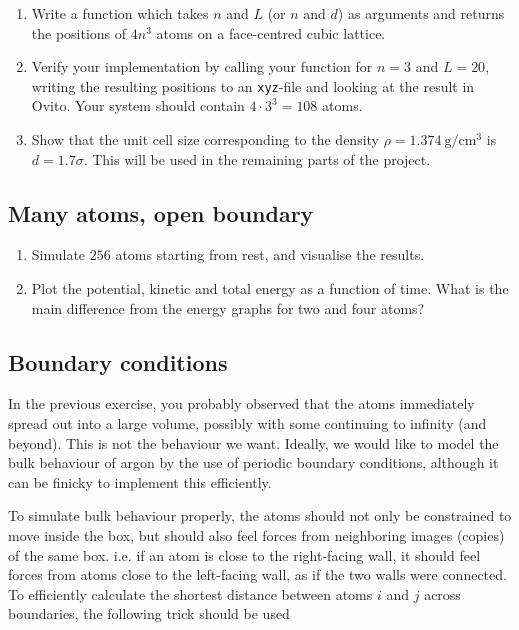 \documentclass[11pt,english,a4paper]{report}
\begin{document}
\begin{enumerate}[label=\roman*.]
    \item Write a function which takes \(n\) and \(L\) (or \(n\) and \(d\)) as arguments and returns the positions of \(4n^3\) atoms on a face-centred cubic lattice.
    \item Verify your implementation by calling your function for \(n=3\) and \(L = 20\), writing the resulting positions to an \texttt{xyz}-file and looking at the result in Ovito. Your system should contain \(4\cdot3^3=108\) atoms.
    \item Show that the unit cell size corresponding to the density \(\rho=\SI{1.374}{\gram\per\cm\tothe3}\) is \(d=1.7 \sigma\). This will be used in the remaining parts of the project.
\end{enumerate}

\subsection{Many atoms, open boundary}
\begin{enumerate}[label=\roman*.]
    \item Simulate \(256\) atoms starting from rest, and visualise the results.
    \item Plot the potential, kinetic and total energy as a function of time. What is the main difference from the energy graphs for two and four atoms?
\end{enumerate}

\subsection{Boundary conditions}

In the previous exercise, you probably observed that the atoms
immediately spread out into a large volume, possibly with some
continuing to infinity (and beyond). This is not the behaviour we
want. Ideally, we would like to model the bulk behaviour of argon by
the use of periodic boundary conditions, although it can be finicky to
implement this efficiently.

To simulate bulk behaviour properly, the atoms should not only be
constrained to move inside the box, but should also feel forces from
neighboring images (copies) of the same box. i.e. if an atom is close
to the right-facing wall, it should feel forces from atoms close to
the left-facing wall, as if the two walls were connected.  To
efficiently calculate the shortest distance between atoms $i$ and $j$
across boundaries, the following trick should be used
\end{document}
